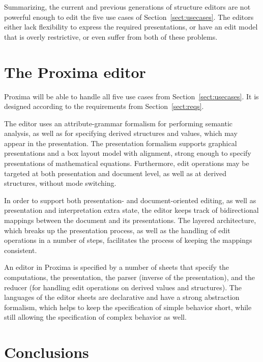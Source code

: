 \documentclass{entcs}
\begin{document}
Summarizing, the current and previous generations of structure editors are not powerful enough to edit the five use cases of Section~\ref{sect:usecases}. The editors either lack flexibility to express the required presentations, or have an edit model that is overly restrictive, or even suffer from both of these problems. 

\section{The Proxima editor}\label{sect:proxEditor}

Proxima will be able to handle all five use cases from Section~\ref{sect:usecases}. It is designed according to the requirements from Section~\ref{sect:reqs}.

The editor uses an attribute-grammar formalism for performing semantic analysis, as well as for specifying derived structures and values, which may appear in the presentation. The presentation formalism supports graphical presentations and a box layout model with alignment, strong enough to specify presentations of mathematical equations. Furthermore, edit operations may be targeted at both presentation and document level, as well as at derived structures, without mode switching.

In order to support both presentation- and document-oriented editing, as well as presentation and interpretation extra state, the editor keeps track of bidirectional mappings between the document and its presentations. The layered architecture, which breaks up the presentation process, as well as the handling of edit operations in a number of steps, facilitates the process of keeping the mappings consistent. 


An editor in Proxima is specified by a number of sheets that specify the computations, the presentation, the parser (inverse of the presentation), and the reducer (for handling edit operations on derived values and structures). The languages of the editor sheets are declarative and have a strong abstraction formalism, which helps to keep the specification of simple behavior short, while still allowing the specification of complex behavior as well.

\section{Conclusions}
\end{document}
